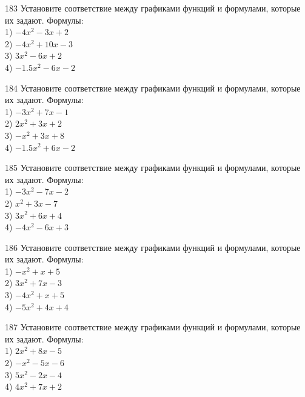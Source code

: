\documentclass[4apaper]{article}
\begin{document}
\begin{taskBN}{183}
Установите соответствие между графиками функций и формулами, которые их задают. Формулы: \\1) $-4x^2-3x+2$\\2) $-4x^2+10x-3$\\3) $3x^2-6x+2$\\4) $-1.5x^2-6x-2$
\end{taskBN}

\begin{taskBN}{184}
Установите соответствие между графиками функций и формулами, которые их задают. Формулы: \\1) $-3x^2+7x-1$\\2) $2x^2+3x+2$\\3) $-x^2+3x+8$\\4) $-1.5x^2+6x-2$
\end{taskBN}

\begin{taskBN}{185}
Установите соответствие между графиками функций и формулами, которые их задают. Формулы: \\1) $-3x^2-7x-2$\\2) $x^2+3x-7$\\3) $3x^2+6x+4$\\4) $-4x^2-6x+3$
\end{taskBN}

\begin{taskBN}{186}
Установите соответствие между графиками функций и формулами, которые их задают. Формулы: \\1) $-x^2+x+5$\\2) $3x^2+7x-3$\\3) $-4x^2+x+5$\\4) $-5x^2+4x+4$
\end{taskBN}

\begin{taskBN}{187}
Установите соответствие между графиками функций и формулами, которые их задают. Формулы: \\1) $2x^2+8x-5$\\2) $-x^2-5x-6$\\3) $5x^2-2x-4$\\4) $4x^2+7x+2$
\end{taskBN}
\end{document}

